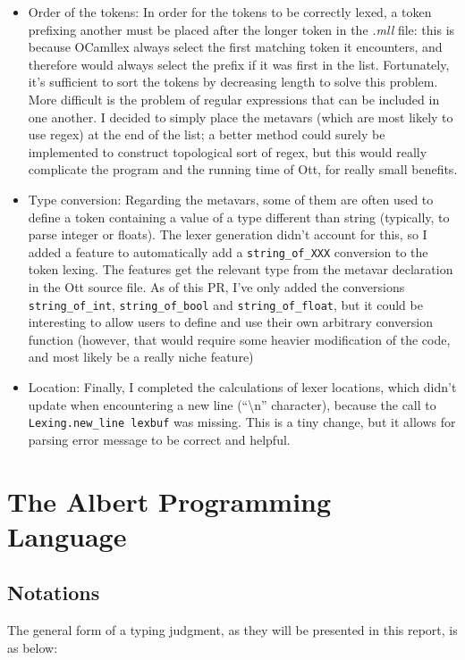 \documentclass{report}
\begin{document}
\begin{itemize}
\item Order of the tokens: In order for the tokens to be correctly lexed, a token prefixing another must be placed after the longer token in the \textit{.mll} file: this is because OCamllex always select the first matching token it encounters, and therefore would always select the prefix if it was first in the list. Fortunately, it's sufficient to sort the tokens by decreasing length to solve this problem. More difficult is the problem of regular expressions that can be included in one another. I decided to simply place the metavars (which are most likely to use regex) at the end of the list; a better method could surely be implemented to construct topological sort of regex, but this would really complicate the program and the running time of Ott, for really small benefits.
\item Type conversion: Regarding the metavars, some of them are often used to define a token containing a value of a type different than string (typically, to parse integer or floats). The lexer generation didn't account for this, so I added a feature to automatically add a \texttt{string\_of\_XXX} conversion to the token lexing. The features get the relevant type from the metavar declaration in the Ott source file. As of this PR, I've only added the conversions \texttt{string\_of\_int}, \texttt{string\_of\_bool} and \texttt{string\_of\_float}, but it could be interesting to allow users to define and use their own arbitrary conversion function (however, that would require some heavier modification of the code, and most likely be a really niche feature)
\item Location: Finally, I completed the calculations of lexer locations, which didn't update when encountering a new line (``\textbackslash n'' character), because the call to \texttt{Lexing.new\_line lexbuf} was missing. This is a tiny change, but it allows for parsing error message to be correct and helpful.
\end{itemize}

\chapter{The Albert Programming Language}

\section*{Notations}

The general form of a typing judgment, as they will be presented in this report, is as below:
\end{document}
